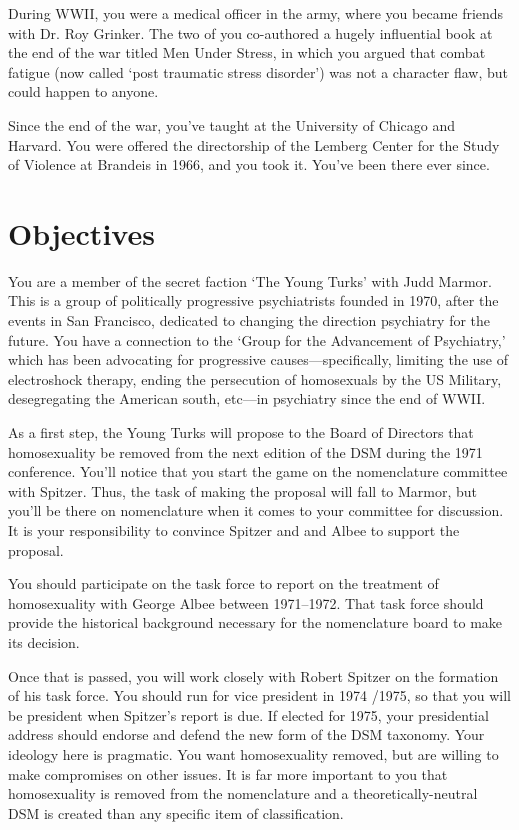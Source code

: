 \begin{refsection}
During WWII, you were a medical officer in the army, where you became friends with Dr. Roy Grinker. The two of you co-authored a hugely influential book at the end of the war titled Men Under Stress, in which you argued that combat fatigue (now called `post traumatic stress disorder') was not a character flaw, but could happen to anyone.

Since the end of the war, you've taught at the University of Chicago and Harvard. You were offered the directorship of the Lemberg Center for the Study of Violence at Brandeis in 1966, and you took it. You've been there ever since.

\section{Objectives}
\label{objectives}

You are a member of the secret faction `The Young Turks' with Judd Marmor. This is a group of politically progressive psychiatrists founded in 1970, after the events in San Francisco, dedicated to changing the direction psychiatry for the future. You have a connection to the `Group for the Advancement of Psychiatry,' which has been advocating for progressive causes---specifically, limiting the use of electroshock therapy, ending the persecution of homosexuals by the US Military, desegregating the American south, etc---in psychiatry since the end of WWII. 

As a first step, the Young Turks will propose to the Board of Directors that homosexuality be removed from the next edition of the DSM during the 1971 conference. You'll notice that you start the game on the nomenclature committee with Spitzer. Thus, the task of making the proposal will fall to Marmor, but you'll be there on nomenclature when it comes to your committee for discussion. It is your responsibility to convince Spitzer and and Albee to support the proposal.

You should participate on the task force to report on the treatment of homosexuality with George Albee between 1971--1972. That task force should provide the historical background necessary for the nomenclature board to make its decision.

Once that is passed, you will work closely with Robert Spitzer on the formation of his task force. You should run for vice president in 1974 \slash  1975, so that you will be president when Spitzer's report is due. If elected for 1975, your presidential address should endorse and defend the new form of the DSM taxonomy. Your ideology here is pragmatic. You want homosexuality removed, but are willing to make compromises on other issues. It is far more important to you that homosexuality is removed from the nomenclature and a theoretically-neutral DSM is created than any specific item of classification.


\end{refsection}

